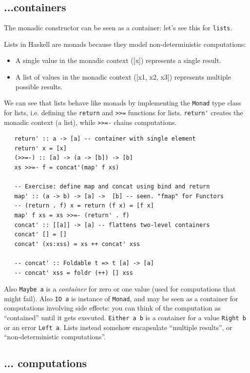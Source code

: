 \subsection{...containers}

The monadic constructor can be seen as a container:
let’s see this for \lstinline|lists|.
{Lists in Haskell are monads because they model non-deterministic computations:\ns
\begin{itemize}
	\item A single value in the monadic context ([x]) represents a single result.
	\item A list of values in the monadic context ([x1, x2, x3]) represents multiple possible results.
\end{itemize}}
We can see that lists behave like monads by implementing the \lstinline|Monad| type class for lists, i.e. defining the \lstinline|return| and \lstinline|>>=| functions for lists.
\lstinline|return'| creates the monadic context (a list), while \lstinline|>>=-| chains computations.


\begin{lstlisting}
   return' :: a -> [a] -- container with single element
   return' x = [x]
   (>>=-) :: [a] -> (a -> [b]) -> [b]
   xs >>=- f = concat'(map' f xs)
   
   -- Exercise: define map and concat using bind and return
   map' :: (a -> b) -> [a] ->  [b] -- seen. "fmap" for Functors
   -- (return . f) x = return (f x) = [f x]
   map' f xs = xs >>=- (return' . f)
   concat' :: [[a]] -> [a] -- flattens two-level containers
   concat' [] = []
   concat' (xs:xss) = xs ++ concat' xss
   
   -- concat' :: Foldable t => t [a] -> [a]
   -- concat' xss = foldr (++) [] xss
\end{lstlisting}

Also \lstinline|Maybe a| is a \textit{container} for zero or one value (used for computations that might fail).
Also \lstinline|IO a| is instance of \lstinline|Monad|, and may be seen as a container for computations involving side effects: you can think of the computation as ``contained'' until it gets executed.
\lstinline|Either a b| is a container for a value \lstinline|Right b| or an error \lstinline|Left a|.
Lists instead somehow encapsulate ``multiple results'', or ``non-deterministic computations''.

\subsection{... computations}

